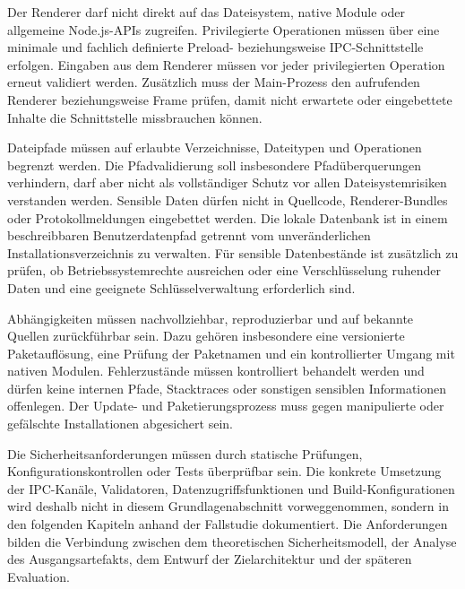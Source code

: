 Der Renderer darf nicht direkt auf das Dateisystem, native Module oder allgemeine Node.js-APIs zugreifen.
Privilegierte Operationen müssen über eine minimale und fachlich definierte Preload- beziehungsweise IPC-Schnittstelle erfolgen.
Eingaben aus dem Renderer müssen vor jeder privilegierten Operation erneut validiert werden.
Zusätzlich muss der Main-Prozess den aufrufenden Renderer beziehungsweise Frame prüfen, damit nicht erwartete oder eingebettete Inhalte die Schnittstelle missbrauchen können.

Dateipfade müssen auf erlaubte Verzeichnisse, Dateitypen und Operationen begrenzt werden.
Die Pfadvalidierung soll insbesondere Pfadüberquerungen verhindern, darf aber nicht als vollständiger Schutz vor allen Dateisystemrisiken verstanden werden.
Sensible Daten dürfen nicht in Quellcode, Renderer-Bundles oder Protokollmeldungen eingebettet werden.
Die lokale Datenbank ist in einem beschreibbaren Benutzerdatenpfad getrennt vom unveränderlichen Installationsverzeichnis zu verwalten.
Für sensible Datenbestände ist zusätzlich zu prüfen, ob Betriebssystemrechte ausreichen oder eine Verschlüsselung ruhender Daten und eine geeignete Schlüsselverwaltung erforderlich sind.

Abhängigkeiten müssen nachvollziehbar, reproduzierbar und auf bekannte Quellen zurückführbar sein.
Dazu gehören insbesondere eine versionierte Paketauflösung, eine Prüfung der Paketnamen und ein kontrollierter Umgang mit nativen Modulen.
Fehlerzustände müssen kontrolliert behandelt werden und dürfen keine internen Pfade, Stacktraces oder sonstigen sensiblen Informationen offenlegen.
Der Update- und Paketierungsprozess muss gegen manipulierte oder gefälschte Installationen abgesichert sein.

Die Sicherheitsanforderungen müssen durch statische Prüfungen, Konfigurationskontrollen oder Tests überprüfbar sein.
Die konkrete Umsetzung der IPC-Kanäle, Validatoren, Datenzugriffsfunktionen und Build-Konfigurationen wird deshalb nicht in diesem Grundlagenabschnitt vorweggenommen, sondern in den folgenden Kapiteln anhand der Fallstudie dokumentiert.
Die Anforderungen bilden die Verbindung zwischen dem theoretischen Sicherheitsmodell, der Analyse des Ausgangsartefakts, dem Entwurf der Zielarchitektur und der späteren Evaluation.

